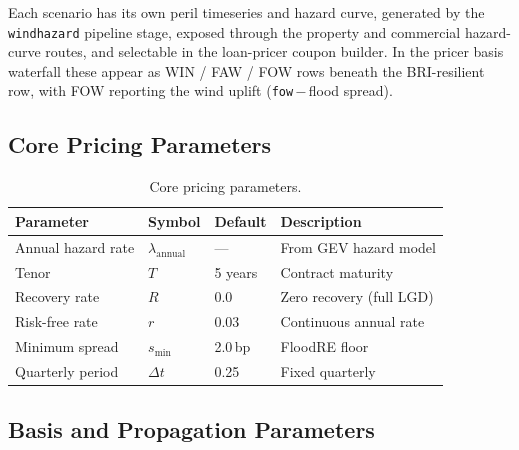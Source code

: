 \documentclass[11pt,a4paper]{article}
\begin{document}
\noindent Each scenario has its own peril timeseries and hazard curve, generated
by the \texttt{windhazard} pipeline stage, exposed through the property and
commercial hazard-curve routes, and selectable in the loan-pricer coupon
builder. In the pricer basis waterfall these appear as WIN / FAW / FOW rows
beneath the BRI-resilient row, with FOW reporting the wind uplift
(\texttt{fow}\,$-$\,flood spread).


\mkminputs

\subsection{Core Pricing Parameters}

\begin{table}[H]
    \centering
    \begin{tabular}{llll}
        \toprule
        \textbf{Parameter} & \textbf{Symbol} & \textbf{Default} & \textbf{Description} \\
        \midrule
        Annual hazard rate      & $\lambda_{\text{annual}}$ & --- & From GEV hazard model \\
        Tenor                   & $T$             & 5 years  & Contract maturity \\
        Recovery rate           & $R$             & 0.0      & Zero recovery (full LGD) \\
        Risk-free rate          & $r$             & 0.03     & Continuous annual rate \\
        Minimum spread          & $s_{\text{min}}$& 2.0\,bp  & FloodRE floor \\
        Quarterly period        & $\Delta t$      & 0.25     & Fixed quarterly \\
        \bottomrule
    \end{tabular}
    \caption{Core pricing parameters.}
    \label{tab:pricing_params}
\end{table}

\subsection{Basis and Propagation Parameters}
\end{document}
